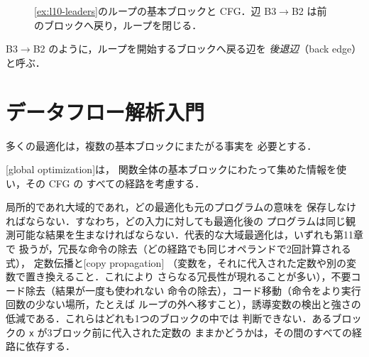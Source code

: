 \documentclass[../main.tex]{subfiles}
\begin{document}
\begin{figure}[tb]
  \centering
  
  \caption{\cref{ex:l10-leaders}のループの基本ブロックと CFG．辺
    B3$\to$B2 は前のブロックへ戻り，ループを閉じる．}
  \label{fig:l10-loop-cfg}
\end{figure}

B3$\to$B2 のように，ループを開始するブロックへ戻る辺を
\emph{後退辺}（back edge）と呼ぶ．

\section{データフロー解析入門}
\label{sec:l10-dfa}

多くの最適化は，複数の基本ブロックにまたがる事実を
必要とする．

\begin{definition}[大域最適化]
  [global optimization]は，
  関数全体の基本ブロックにわたって集めた情報を使い，その CFG の
  すべての経路を考慮する．
\end{definition}

局所的であれ大域的であれ，どの最適化も元のプログラムの意味を
保存しなければならない．すなわち，どの入力に対しても最適化後の
プログラムは同じ観測可能な結果を生まなければならない．代表的な大域最適化は，いずれも第11章で
扱うが，冗長な命令の除去（どの経路でも同じオペランドで2回計算される式），
定数伝播と[copy propagation]
（変数を，それに代入された定数や別の変数で置き換えること．これにより
さらなる冗長性が現れることが多い），不要コード除去（結果が一度も使われない
命令の除去），コード移動（命令をより実行回数の少ない場所，たとえば
ループの外へ移すこと），誘導変数の検出と強さの低減である．これらはどれも1つのブロックの中では
判断できない．あるブロックの \texttt{x} が3ブロック前に代入された定数の
ままかどうかは，その間のすべての経路に依存する．
\end{document}
